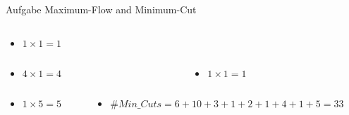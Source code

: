 \begin{frame}[allowframebreaks]{Aufgabe \thesection}{Maximum-Flow and Minimum-Cut}
\begin{solutionnoinc}
\begin{columns}
\begin{column}{0.5\textwidth}
\begin{itemize}
          \item $1\times 1 = 1$
        \end{itemize}
      \end{column}
    \end{columns}
  \end{solutionnoinc}
  \begin{solutionnoinc}
    \begin{columns}
      \begin{column}{0.5\textwidth}
        \begin{itemize}
          \item $4\times 1 = 4$
        \end{itemize}
      \end{column}
      \begin{column}{0.5\textwidth}
        \begin{itemize}
          \item $1\times 1 = 1$
        \end{itemize}
      \end{column}
    \end{columns}
  \end{solutionnoinc}
  \begin{solution}
    \begin{columns}
      \begin{column}{0.5\textwidth}
        \begin{itemize}
          \item $1\times 5 = 5$
        \end{itemize}
      \end{column}
      \begin{column}{0.5\textwidth}
        \begin{itemize}
          \item $\#Min\_Cuts = 6 + 10 + 3 + 1 + 2 + 1 + 4 + 1 + 5 = 33$
        \end{itemize}

\end{column}
\end{columns}
\end{solution}
\end{frame}

